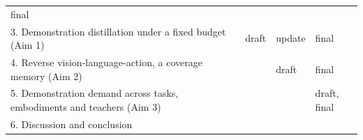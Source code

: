 \documentclass[
  11pt,
]{article}
\begin{document}
\begin{longtable}[]{@{}llll@{}}
\begin{minipage}[t]{0.10\columnwidth}
final\strut
\end{minipage}\tabularnewline
\begin{minipage}[t]{0.58\columnwidth}\raggedright
3. Demonstration distillation under a fixed budget (Aim 1)\strut
\end{minipage} & \begin{minipage}[t]{0.10\columnwidth}\raggedright
draft\strut
\end{minipage} & \begin{minipage}[t]{0.10\columnwidth}\raggedright
update\strut
\end{minipage} & \begin{minipage}[t]{0.10\columnwidth}\raggedright
final\strut
\end{minipage}\tabularnewline
\begin{minipage}[t]{0.58\columnwidth}\raggedright
4. Reverse vision-language-action, a coverage memory (Aim 2)\strut
\end{minipage} & \begin{minipage}[t]{0.10\columnwidth}\raggedright
\strut
\end{minipage} & \begin{minipage}[t]{0.10\columnwidth}\raggedright
draft\strut
\end{minipage} & \begin{minipage}[t]{0.10\columnwidth}\raggedright
final\strut
\end{minipage}\tabularnewline
\begin{minipage}[t]{0.58\columnwidth}\raggedright
5. Demonstration demand across tasks, embodiments and teachers (Aim
3)\strut
\end{minipage} & \begin{minipage}[t]{0.10\columnwidth}\raggedright
\strut
\end{minipage} & \begin{minipage}[t]{0.10\columnwidth}\raggedright
\strut
\end{minipage} & \begin{minipage}[t]{0.10\columnwidth}\raggedright
draft, final\strut
\end{minipage}\tabularnewline
\begin{minipage}[t]{0.58\columnwidth}\raggedright
6. Discussion and conclusion\strut
\end{minipage} & \begin{minipage}[t]{0.10\columnwidth}\raggedright
\strut
\end{minipage} & \begin{minipage}[t]{0.10\columnwidth}\raggedright

\end{minipage}
\end{longtable}
\end{document}
